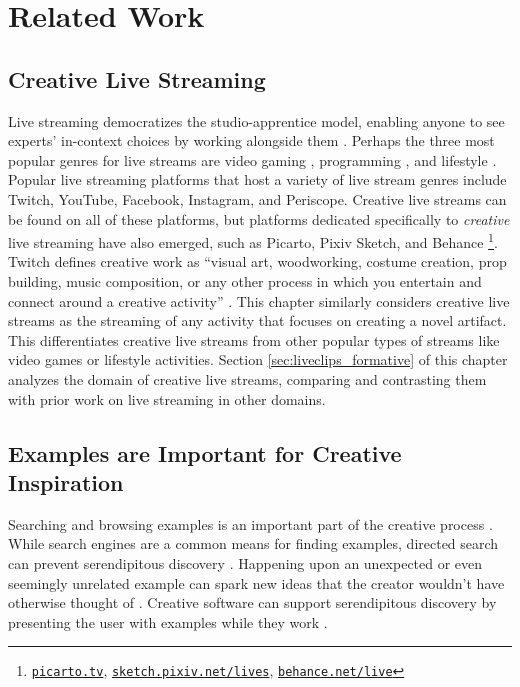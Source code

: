 \section{Related Work}

\subsection{Creative Live Streaming}
Live streaming democratizes the studio-apprentice model, enabling anyone to see experts' in-context choices by working alongside them \cite{Schon1985}. Perhaps the three most popular genres for live streams are video gaming \cite{Pellicone2017, Lessel2017, Sjoblom2017, Hamilton2014}, programming \cite{Faas2018, Haaranen2017}, and lifestyle \cite{Lu2018a, Tang2016}. Popular live streaming platforms that host a variety of live stream genres include Twitch, YouTube, Facebook, Instagram, and Periscope. Creative live streams can be found on all of these platforms, but platforms dedicated specifically to \textit{creative} live streaming have also emerged, such as Picarto, Pixiv Sketch, and Behance \footnote{\href{www.picarto.tv}{\nolinkurl{picarto.tv}}, \href{https://sketch.pixiv.net/lives}{\nolinkurl{sketch.pixiv.net/lives}}, \href{https://behance.net/live}{\nolinkurl{behance.net/live}}}. Twitch defines creative work as ``visual art, woodworking, costume creation, prop building, music composition, or any other process in which you entertain and connect around a creative activity'' \cite{Moorier2015}. This chapter similarly considers creative live streams as the streaming of any activity that focuses on creating a novel artifact. This differentiates creative live streams from other popular types of streams like video games or lifestyle activities. Section \ref{sec:liveclips_formative} of this chapter analyzes the domain of creative live streams, comparing and contrasting them with prior work on live streaming in other domains. 

\subsection{Examples are Important for Creative Inspiration}
Searching and browsing examples is an important part of the creative process \cite{Shneiderman2002, Shneiderman2007, Greene2002, Herring2009, Muller-Wienbergen2011, Bawden1986}. 
While search engines are a common means for finding examples, directed search can prevent serendipitous discovery \cite{Benjamin2014}. Happening upon an unexpected or even seemingly unrelated example can spark new ideas that the creator wouldn't have otherwise thought of \cite{Erdelez1999, Benjamin2014}.
Creative software can support serendipitous discovery by presenting the user with examples while they work \cite{Bawden1986, Kulkarni2014, Herring2009}.

